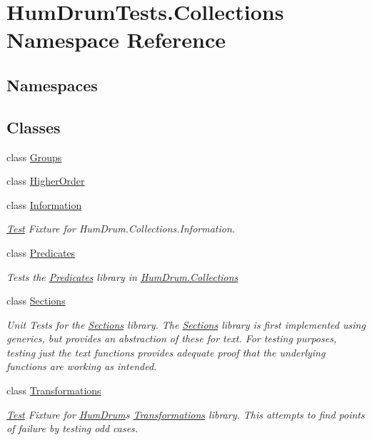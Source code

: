\hypertarget{namespaceHumDrumTests_1_1Collections}{}\section{Hum\+Drum\+Tests.\+Collections Namespace Reference}
\label{namespaceHumDrumTests_1_1Collections}
\subsection*{Namespaces}
\begin{DoxyCompactItemize}
\end{DoxyCompactItemize}
\subsection*{Classes}
\begin{DoxyCompactItemize}
\item 
class \hyperlink{classHumDrumTests_1_1Collections_1_1Groups}{Groups}
\item 
class \hyperlink{classHumDrumTests_1_1Collections_1_1HigherOrder}{Higher\+Order}
\item 
class \hyperlink{classHumDrumTests_1_1Collections_1_1Information}{Information}
\begin{DoxyCompactList}\small\item\em \hyperlink{classHumDrumTests_1_1Test}{Test} Fixture for Hum\+Drum.\+Collections.\+Information. \end{DoxyCompactList}\item 
class \hyperlink{classHumDrumTests_1_1Collections_1_1Predicates}{Predicates}
\begin{DoxyCompactList}\small\item\em Tests the \hyperlink{classHumDrumTests_1_1Collections_1_1Predicates}{Predicates} library in \hyperlink{namespaceHumDrum_1_1Collections}{Hum\+Drum.\+Collections} \end{DoxyCompactList}\item 
class \hyperlink{classHumDrumTests_1_1Collections_1_1Sections}{Sections}
\begin{DoxyCompactList}\small\item\em Unit Tests for the \hyperlink{classHumDrumTests_1_1Collections_1_1Sections}{Sections} library. The \hyperlink{classHumDrumTests_1_1Collections_1_1Sections}{Sections} library is first implemented using generics, but provides an abstraction of these for text. For testing purposes, testing just the text functions provides adequate proof that the underlying functions are working as intended. \end{DoxyCompactList}\item 
class \hyperlink{classHumDrumTests_1_1Collections_1_1Transformations}{Transformations}
\begin{DoxyCompactList}\small\item\em \hyperlink{classHumDrumTests_1_1Test}{Test} Fixture for \hyperlink{namespaceHumDrum}{Hum\+Drum}\textquotesingle{}s \hyperlink{classHumDrumTests_1_1Collections_1_1Transformations}{Transformations} library. This attempts to find points of failure by testing odd cases. \end{DoxyCompactList}\end{DoxyCompactItemize}
